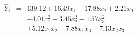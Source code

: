 

\[
\begin{array}{lll} \hat{Y}_{1} & = & 139.12 + 16.49x_1 + 17.88x_2 + 2.21x_3 \\ & & - 4.01x_{1}^2 - 3.45x_{2}^2 - 1.57x_{3}^2 \\ & & + 5.12x_{1}x_{2} - 7.88x_{1}x_{3} - 7.13x_{2}x_{3} \end{array}
\]


